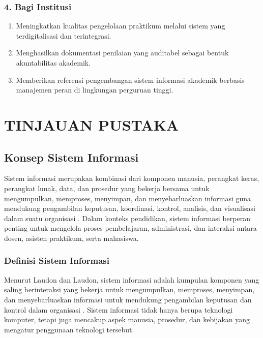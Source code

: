 \documentclass[12pt,a4paper,twoside]{report}
\begin{document}
\subsection*{4. Bagi Institusi}
\begin{enumerate}[label=\alph*.]
    \item Meningkatkan kualitas pengelolaan praktikum melalui sistem yang terdigitalisasi dan terintegrasi.
    \item Menghasilkan dokumentasi penilaian yang auditabel sebagai bentuk akuntabilitas akademik.
    \item Memberikan referensi pengembangan sistem informasi akademik berbasis manajemen peran di lingkungan perguruan tinggi.
\end{enumerate}
\chapter{TINJAUAN PUSTAKA}

\section{Konsep Sistem Informasi}

Sistem informasi merupakan kombinasi dari komponen manusia, perangkat keras, perangkat lunak, data, dan prosedur yang bekerja bersama untuk mengumpulkan, memproses, menyimpan, dan menyebarluaskan informasi guna mendukung pengambilan keputusan, koordinasi, kontrol, analisis, dan visualisasi dalam suatu organisasi \cite{laudon2016}. Dalam konteks pendidikan, sistem informasi berperan penting untuk mengelola proses pembelajaran, administrasi, dan interaksi antara dosen, asisten praktikum, serta mahasiswa.

\subsection{Definisi Sistem Informasi}

Menurut Laudon dan Laudon, sistem informasi adalah kumpulan komponen yang saling berinteraksi yang bekerja untuk mengumpulkan, memproses, menyimpan, dan menyebarluaskan informasi untuk mendukung pengambilan keputusan dan kontrol dalam organisasi \cite{laudon2016}. Sistem informasi tidak hanya berupa teknologi komputer, tetapi juga mencakup aspek manusia, prosedur, dan kebijakan yang mengatur penggunaan teknologi tersebut.
\end{document}
